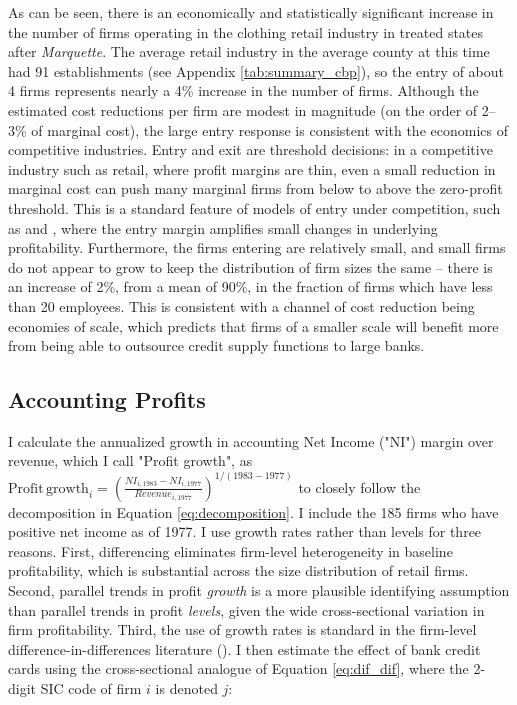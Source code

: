 \documentclass[12pt,english]{article}
\begin{document}
As can be seen, there is an economically and statistically significant increase in the number of firms operating in the clothing retail industry in treated states after \emph{Marquette}. The average retail industry in the average county at this time had 91 establishments (see Appendix \ref{tab:summary_cbp}), so the entry of about 4 firms represents nearly a 4\% increase in the number of firms. Although the estimated cost reductions per firm are modest in magnitude (on the order of 2--3\% of marginal cost), the large entry response is consistent with the economics of competitive industries. Entry and exit are threshold decisions: in a competitive industry such as retail, where profit margins are thin, even a small reduction in marginal cost can push many marginal firms from below to above the zero-profit threshold. This is a standard feature of models of entry under competition, such as \cite{hopenhayn_entry_1992} and \cite{melitz_impact_2003}, where the entry margin amplifies small changes in underlying profitability. Furthermore, the firms entering are relatively small, and small firms do not appear to grow to keep the distribution of firm sizes the same -- there is an increase of 2\%, from a mean of 90\%, in the fraction of firms which have less than 20 employees. This is consistent with a channel of cost reduction being economies of scale, which predicts that firms of a smaller scale will benefit more from being able to outsource credit supply functions to large banks. 

\subsection{Accounting Profits}

I calculate the annualized growth in accounting Net Income ("NI") margin over revenue, which I call "Profit growth", as $\mathrm{Profit\,growth}_i = \left(\frac{NI_{i,1983} - NI_{i,1977}}{Revenue_{i,1977}}\right) ^ {1/(1983-1977)}$ to closely follow the decomposition in Equation \ref{eq:decomposition}. I include the 185 firms who have positive net income as of 1977. I use growth rates rather than levels for three reasons. First, differencing eliminates firm-level heterogeneity in baseline profitability, which is substantial across the size distribution of retail firms. Second, parallel trends in profit \emph{growth} is a more plausible identifying assumption than parallel trends in profit \emph{levels}, given the wide cross-sectional variation in firm profitability. Third, the use of growth rates is standard in the firm-level difference-in-differences literature (\cite{beck_finance_2008}). I then estimate the effect of bank credit cards using the cross-sectional analogue of Equation \ref{eq:dif_dif}, where the 2-digit SIC code of firm $i$ is denoted $j$: 
\end{document}

